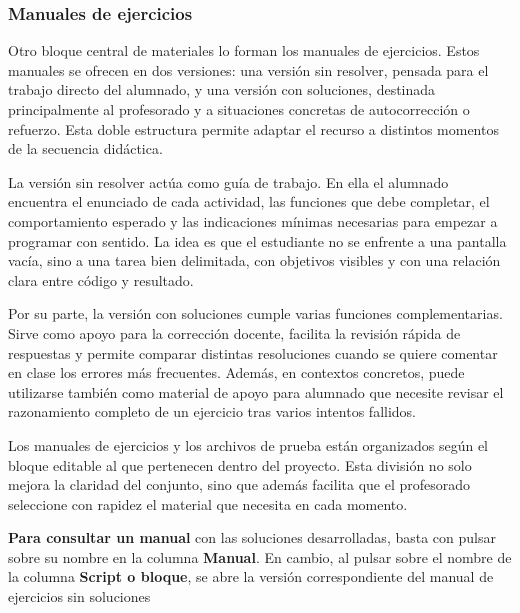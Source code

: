 \documentclass[a4paper,12pt]{article}
\newcounter{subsubsubsection}[subsubsection]
\begin{document}
\subsubsection{Manuales de ejercicios}

Otro bloque central de materiales lo forman los manuales de ejercicios. Estos manuales se ofrecen en dos versiones: una versión sin resolver, pensada para el trabajo directo del alumnado, y una versión con soluciones, destinada principalmente al profesorado y a situaciones concretas de autocorrección o refuerzo. Esta doble estructura permite adaptar el recurso a distintos momentos de la secuencia didáctica.

La versión sin resolver actúa como guía de trabajo. En ella el alumnado encuentra el enunciado de cada actividad, las funciones que debe completar, el comportamiento esperado y las indicaciones mínimas necesarias para empezar a programar con sentido. La idea es que el estudiante no se enfrente a una pantalla vacía, sino a una tarea bien delimitada, con objetivos visibles y con una relación clara entre código y resultado.

Por su parte, la versión con soluciones cumple varias funciones complementarias. Sirve como apoyo para la corrección docente, facilita la revisión rápida de respuestas y permite comparar distintas resoluciones cuando se quiere comentar en clase los errores más frecuentes. Además, en contextos concretos, puede utilizarse también como material de apoyo para alumnado que necesite revisar el razonamiento completo de un ejercicio tras varios intentos fallidos.


Los manuales de ejercicios y los archivos de prueba están organizados según el bloque editable al que pertenecen dentro del proyecto. Esta división no solo mejora la claridad del conjunto, sino que además facilita que el profesorado seleccione con rapidez el material que necesita en cada momento.  

\textbf{Para consultar un manual} con las soluciones desarrolladas, basta con pulsar sobre su nombre en la columna \textbf{Manual}. En cambio, al pulsar sobre el nombre de la columna \textbf{Script o bloque}, se abre la versión correspondiente del manual de ejercicios sin soluciones
\end{document}
